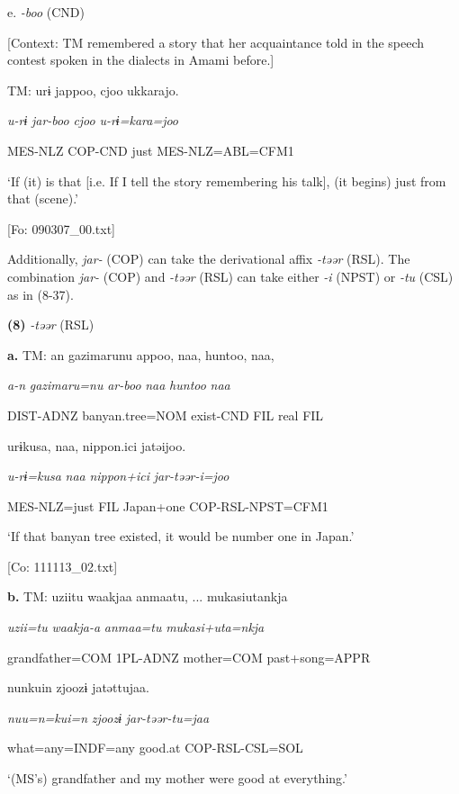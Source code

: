   e.  \textit{{}-boo} (CND)

    [Context: TM remembered a story that her acquaintance told in the speech contest spoken in the dialects in Amami before.]

    TM:  urɨ  jappoo,  cjoo  ukkarajo.

      \textit{u-rɨ}  \textit{jar-boo}  \textit{cjoo}  \textit{u-rɨ=kara=joo}

      MES-NLZ  COP-CND  just  MES-NLZ=ABL=CFM1

      ‘If (it) is that [i.e. If I tell the story remembering his talk], (it begins) just from that (scene).’

      [Fo: 090307\_00.txt]

Additionally, \textit{jar-} (COP) can take the derivational affix \textit{{}-təər} (RSL). The combination \textit{jar-} (COP) and \textit{{}-təər} (RSL) can take either \textit{{}-i} (NPST) or \textit{{}-tu} (CSL) as in (8-37).

\textbf{(8)}  \textit{{}-təər} (RSL)

  \textbf{a.}  TM:  an  gazimarunu  appoo,  naa,  huntoo,  naa,

      \textit{a-n}  \textit{gazimaru=nu}  \textit{ar-boo}  \textit{naa}  \textit{huntoo}  \textit{naa}

      DIST-ADNZ  banyan.tree=NOM  exist-CND  FIL  real  FIL

      urɨkusa,  naa,  {\textbar}nippon.ici{\textbar}  jatəijoo.

      \textit{u-rɨ=kusa}  \textit{naa}  \textit{nippon+ici}  \textit{jar-təər-i=joo}

      MES-NLZ=just  FIL  Japan+one  COP-RSL-NPST=CFM1

      ‘If that banyan tree existed, it would be number one in Japan.’

      [Co: 111113\_02.txt]

  \textbf{b.}  TM:  uziitu  waakjaa  anmaatu, ...  mukasiutankja

      \textit{uzii=tu}  \textit{waakja-a}  \textit{anmaa=tu}  \textit{mukasi+uta=nkja}

      grandfather=COM  1PL-ADNZ  mother=COM  past+song=APPR

      nunkuin  zjoozɨ  jatəttujaa.

      \textit{nuu=n=kui=n}  \textit{zjoozɨ}  \textit{jar-təər-tu=jaa}

      what=any=INDF=any  good.at  COP-RSL-CSL=SOL

      ‘(MS’s) grandfather and my mother were good at everything.’

